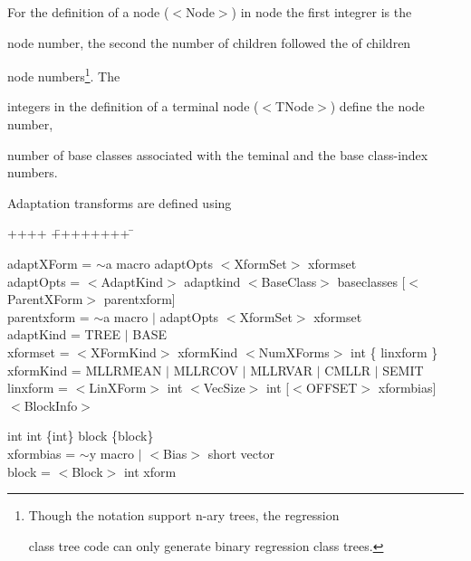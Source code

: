 \noindent


For the definition of a node ($<$Node$>$) in {\sf node} the first integrer is the 


node number, the second the number of children followed the of children


node numbers\footnote{Though the notation support n-ary trees, the regression


class tree code can only generate binary regression class trees.}. The 


integers in the definition of a terminal node ($<$TNode$>$) define the node number, 


number of base classes associated with the teminal and the base class-index numbers.





Adaptation transforms are defined using


{\sf


\begin{tabbing}


++++ \= ++++++++ \=  \kill


\>  adaptXForm  = \> $\sim$a macro adaptOpts $<$XformSet$>$ xformset \\


\>  adaptOpts   = \> $<$AdaptKind$>$ adaptkind $<$BaseClass$>$ baseclasses [$<$ParentXForm$>$ parentxform]  \\


\>  parentxform = \> $\sim$a macro $|$ adaptOpts $<$XformSet$>$ xformset\\


\>  adaptKind   = \> TREE $|$ BASE\\


\>  xformset    = \> $<$XFormKind$>$ xformKind $<$NumXForms$>$ int \{ linxform \}\\


\>  xformKind   = \> MLLRMEAN $|$ MLLRCOV $|$ MLLRVAR $|$ CMLLR $|$ SEMIT\\


\>  linxform    = \> $<$LinXForm$>$ int $<$VecSize$>$ int [$<$OFFSET$>$ xformbias] \\


\>                \> $<$BlockInfo$>$ 


int int \{int\} block \{block\}\\


\>  xformbias = \> $\sim$y macro $|$ $<$Bias$>$ short vector \\


\>  block       = \> $<$Block$>$ int xform\\


\end{tabbing}


}



